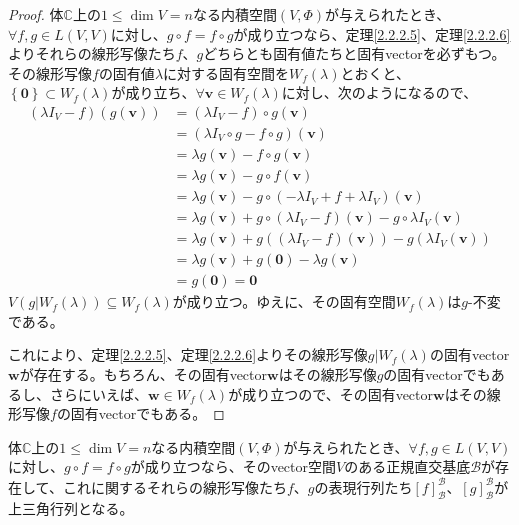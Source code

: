 \documentclass[dvipdfmx]{jsarticle}
\begin{document}
\begin{proof}
体$\mathbb{C}$上の$1 \leq \dim V = n$なる内積空間$(V,\varPhi)$が与えられたとき、$\forall f,g \in L(V,V)$に対し、$g \circ f = f \circ g$が成り立つなら、定理\ref{2.2.2.5}、定理\ref{2.2.2.6}よりそれらの線形写像たち$f$、$g$どちらとも固有値たちと固有vectorを必ずもつ。その線形写像$f$の固有値$\lambda$に対する固有空間を$W_{f}(\lambda)$とおくと、$\left\{ \mathbf{0} \right\} \subset W_{f}(\lambda)$が成り立ち、$\forall\mathbf{v} \in W_{f}(\lambda)$に対し、次のようになるので、
\begin{align*}
\left( \lambda I_{V} - f \right)\left( g\left( \mathbf{v} \right) \right) &= \left( \lambda I_{V} - f \right) \circ g\left( \mathbf{v} \right)\\
&= \left( \lambda I_{V} \circ g - f \circ g \right)\left( \mathbf{v} \right)\\
&= \lambda g\left( \mathbf{v} \right) - f \circ g\left( \mathbf{v} \right)\\
&= \lambda g\left( \mathbf{v} \right) - g \circ f\left( \mathbf{v} \right)\\
&= \lambda g\left( \mathbf{v} \right) - g \circ \left( - \lambda I_{V} + f + \lambda I_{V} \right)\left( \mathbf{v} \right)\\
&= \lambda g\left( \mathbf{v} \right) + g \circ \left( \lambda I_{V} - f \right)\left( \mathbf{v} \right) - g \circ \lambda I_{V}\left( \mathbf{v} \right)\\
&= \lambda g\left( \mathbf{v} \right) + g\left( \left( \lambda I_{V} - f \right)\left( \mathbf{v} \right) \right) - g\left( \lambda I_{V}\left( \mathbf{v} \right) \right)\\
&= \lambda g\left( \mathbf{v} \right) + g\left( \mathbf{0} \right) - \lambda g\left( \mathbf{v} \right)\\
&= g\left( \mathbf{0} \right) = \mathbf{0}
\end{align*}
$V\left( g|W_{f}(\lambda) \right) \subseteq W_{f}(\lambda)$が成り立つ。ゆえに、その固有空間$W_{f}(\lambda)$は$g$-不変である。\par
これにより、定理\ref{2.2.2.5}、定理\ref{2.2.2.6}よりその線形写像$g|W_{f}(\lambda)$の固有vector$\mathbf{w}$が存在する。もちろん、その固有vector$\mathbf{w}$はその線形写像$g$の固有vectorでもあるし、さらにいえば、$\mathbf{w} \in W_{f}(\lambda)$が成り立つので、その固有vector$\mathbf{w}$はその線形写像$f$の固有vectorでもある。
\end{proof}
\begin{thm}\label{2.3.9.2}
体$\mathbb{C}$上の$1 \leq \dim V = n$なる内積空間$(V,\varPhi)$が与えられたとき、$\forall f,g \in L(V,V)$に対し、$g \circ f = f \circ g$が成り立つなら、そのvector空間$V$のある正規直交基底$\mathcal{B}$が存在して、これに関するそれらの線形写像たち$f$、$g$の表現行列たち$[ f]_{\mathcal{B}}^{\mathcal{B}}$、$[ g]_{\mathcal{B}}^{\mathcal{B}}$が上三角行列となる。
\end{thm}
\end{document}
